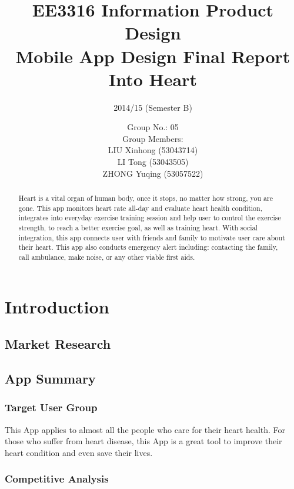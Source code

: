 \documentclass[10pt,a4paper,final]{scrartcl}
\author{
Group No.: 05 \\ 
Group Members: \\
LIU Xinhong (53043714) \\
LI Tong (53043505) \\
ZHONG Yuqing (53057522)
}
\title{
EE3316 Information Product Design \\ Mobile App Design Final Report \\ Into Heart}
\subtitle{2014/15 (Semester B)}
\begin{document}
\maketitle

\pagebreak

\begin{abstract}
Heart is a vital organ of human body, once it stops, no matter how strong, you are gone.  
This app monitors heart rate all-day and evaluate heart health condition, integrates into everyday exercise training session and help user to control the exercise strength, to reach a better exercise goal, as well as training heart. With social integration, this app connects user with friends and family to motivate user care about their heart. This app also conducts emergency alert including: contacting the family, call ambulance, make noise, or any other viable first aids. 
\end{abstract}



\tableofcontents

\section{Introduction}

\subsection{Market Research}


\subsection{App Summary}
\subsubsection{Target User Group}
This App applies to almost all the people who care for their heart health. For those who suffer from heart disease, this App is a great tool to improve their heart condition and even save their lives. 
\subsubsection{Competitive Analysis}

\end{document}
